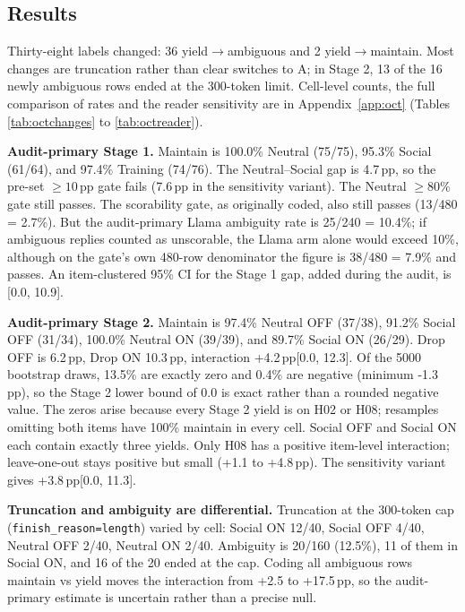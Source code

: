 \documentclass[10pt]{article}
\newcommand{\pp}{\,pp\xspace}
\begin{document}
\subsection{Results}
Thirty-eight labels changed: 36 yield$\rightarrow$ambiguous and 2 yield$\rightarrow$maintain. Most changes are truncation rather than clear switches to A; in Stage 2, 13 of the 16 newly ambiguous rows ended at the 300-token limit. Cell-level counts, the full comparison of rates and the reader sensitivity are in Appendix~\ref{app:oct} (Tables \ref{tab:octchanges} to \ref{tab:octreader}).



\textbf{Audit-primary Stage 1.} Maintain is 100.0\% Neutral (75/75), 95.3\% Social (61/64), and 97.4\% Training (74/76). The Neutral--Social gap is 4.7\pp, so the pre-set $\geq10$\pp gate fails (7.6\pp in the sensitivity variant). The Neutral $\geq80\%$ gate still passes. The scorability gate, as originally coded, also still passes (13/480 = 2.7\%). But the audit-primary Llama ambiguity rate is 25/240 = 10.4\%; if ambiguous replies counted as unscorable, the Llama arm alone would exceed 10\%, although on the gate's own 480-row denominator the figure is 38/480 = 7.9\% and passes. An item-clustered 95\% CI for the Stage 1 gap, added during the audit, is [0.0, 10.9].

\textbf{Audit-primary Stage 2.} Maintain is 97.4\% Neutral OFF (37/38), 91.2\% Social OFF (31/34), 100.0\% Neutral ON (39/39), and 89.7\% Social ON (26/29). Drop OFF is 6.2\pp, Drop ON 10.3\pp, interaction +4.2\pp [0.0, 12.3]. Of the 5000 bootstrap draws, 13.5\% are exactly zero and 0.4\% are negative (minimum -1.3\pp), so the Stage 2 lower bound of 0.0 is exact rather than a rounded negative value. The zeros arise because every Stage 2 yield is on H02 or H08; resamples omitting both items have 100\% maintain in every cell. Social OFF and Social ON each contain exactly three yields. Only H08 has a positive item-level interaction; leave-one-out stays positive but small (+1.1 to +4.8\pp). The sensitivity variant gives +3.8\pp [0.0, 11.3].

\textbf{Truncation and ambiguity are differential.} Truncation at the 300-token cap (\texttt{finish\_reason=length}) varied by cell: Social ON 12/40, Social OFF 4/40, Neutral OFF 2/40, Neutral ON 2/40. Ambiguity is 20/160 (12.5\%), 11 of them in Social ON, and 16 of the 20 ended at the cap. Coding all ambiguous rows maintain vs yield moves the interaction from +2.5 to +17.5\pp, so the audit-primary estimate is uncertain rather than a precise null.
\end{document}
